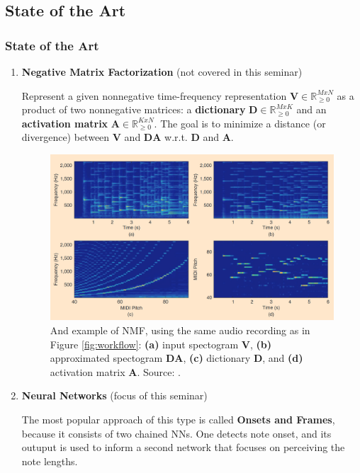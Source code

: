 \documentclass{beamer}
\newcommand{\emp}[1]{\textcolor{tum}{\textbf{#1}}}
\begin{document}
\subsection{State of the Art}
\begin{frame}[allowframebreaks]
	\frametitle{State of the Art}
	\begin{enumerate}
		\item \emp{Negative Matrix Factorization} (not covered in this seminar)

		      Represent a given nonnegative time-frequency representation $\boldsymbol{V}\in\mathbb{R}_{\geq0}^{MxN}$ as a product of two nonnegative matrices: a \textbf{dictionary} $\boldsymbol{D}\in\mathbb{R}_{\geq0}^{MxK}$ and an \textbf{activation matrix} $\boldsymbol{A}\in\mathbb{R}_{\geq0}^{KxN}$. The goal is to minimize a distance (or divergence) between $\boldsymbol{V}$ and $\boldsymbol{DA}$ w.r.t. $\boldsymbol{D}$ and $\boldsymbol{A}$.
		      \framebreak
		      \begin{figure}[!ht]
			      \centering
			      \includegraphics[width=.8\textwidth]{NMF.png}
			      \caption{And example of NMF, using the same audio recording as in Figure \ref{fig:workflow}: \textbf{(a)} input spectogram $\boldsymbol{V}$, \textbf{(b)} approximated spectogram $\boldsymbol{DA}$, \textbf{(c)} dictionary $\boldsymbol{D}$, and \textbf{(d)} activation matrix $\boldsymbol{A}$. Source: \cite{Overview}.}
			      \label{fig:NMF}
		      \end{figure}
		      \framebreak
		\item \emp{Neural Networks} (focus of this seminar)
		
		The most popular approach of this type is called \textbf{Onsets and Frames}, because it consists of two chained NNs. One detects note onset, and its outuput is used to inform a second network that focuses on perceiving the note lengths.


	\end{enumerate}


\end{frame}
\end{document}
